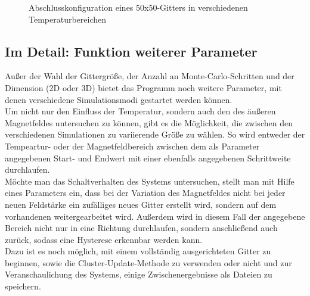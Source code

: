 \begin{figure}[H]
	\centering
	\caption{Abschlusskonfiguration eines 50x50-Gitters in verschiedenen Temperaturbereichen}
	\label{mp2dconfig}
\end{figure}


\subsection{Im Detail: Funktion weiterer Parameter}
\label{met4}

Außer der Wahl der Gittergröße, der Anzahl an Monte-Carlo-Schritten und der Dimension (2D oder 3D) bietet das Programm noch weitere Parameter, mit denen verschiedene Simulationsmodi gestartet werden können.\\
Um nicht nur den Einfluss der Temperatur, sondern auch den des äußeren Magnetfeldes untersuchen zu können, gibt es die Möglichkeit, die zwischen den verschiedenen Simulationen zu variierende Größe zu wählen. So wird entweder der Tempeartur- oder der Magnetfeldbereich zwischen dem als Parameter angegebenen Start- und Endwert mit einer ebenfalls angegebenen Schrittweite durchlaufen.\\
Möchte man das Schaltverhalten des Systems untersuchen, stellt man mit Hilfe eines Parameters ein, dass bei der Variation des Magnetfeldes nicht bei jeder neuen Feldstärke ein zufälliges neues Gitter erstellt wird, sondern auf dem vorhandenen weitergearbeitet wird. Außerdem wird in diesem Fall der angegebene Bereich nicht nur in eine Richtung durchlaufen, sondern anschließend auch zurück, sodass eine Hysterese erkennbar werden kann.\\
Dazu ist es noch möglich, mit einem vollständig ausgerichteten Gitter zu beginnen, sowie die Cluster-Update-Methode zu verwenden oder nicht und zur Veranschaulichung des Systems, einige Zwischenergebnisse als Dateien zu speichern.
